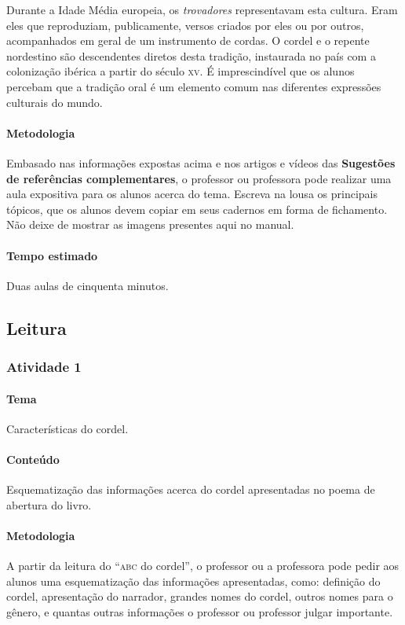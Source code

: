 \documentclass[11pt]{extarticle}
\begin{document}
Durante a Idade Média europeia, os \textit{trovadores} representavam esta cultura.
Eram eles que reproduziam, publicamente, versos criados por eles ou por outros, 
acompanhados em geral de um instrumento de cordas. O cordel e o repente nordestino
são descendentes diretos desta tradição, instaurada no país com a colonização ibérica
a partir do século \textsc{xv}. É imprescindível que os alunos 
percebam que a tradição oral é um elemento comum nas diferentes expressões
culturais do mundo.


\paragraph{Metodologia} Embasado nas informações expostas acima e nos
artigos e vídeos das \textbf{Sugestões de referências complementares},
o professor ou professora pode realizar uma aula expositiva para os
alunos acerca do tema. Escreva na lousa os principais tópicos,
que os alunos devem copiar em seus cadernos em forma de fichamento. 
Não deixe de mostrar as imagens presentes aqui no manual.


\paragraph{Tempo estimado} Duas aulas de cinquenta minutos.

\subsection{Leitura}

\subsubsection{Atividade 1} 

\paragraph{Tema} Características do cordel.

\paragraph{Conteúdo} Esquematização das informações acerca do cordel 
apresentadas no poema de abertura do livro. 

\paragraph{Metodologia} A partir da leitura do ``\textsc{abc} do cordel'', o professor ou a professora pode pedir
aos alunos uma esquematização das informações apresentadas, como:
definição do cordel, apresentação do narrador, grandes nomes do cordel,
outros nomes para o gênero, e quantas outras informações o professor ou professor
julgar importante. 
\end{document}
